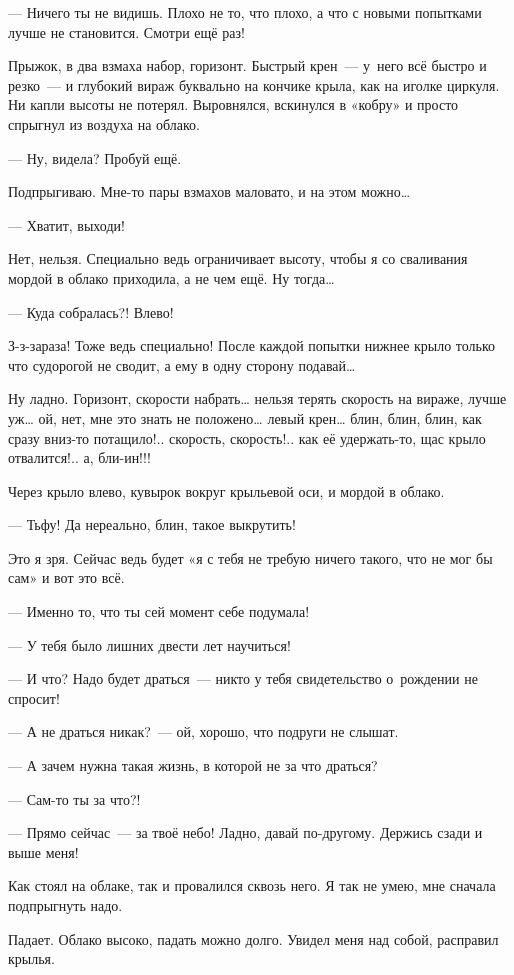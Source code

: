 \documentclass[fontsize=11pt,a5paper,titlepage=firstcover]{scrbook}
\begin{document}
--- Ничего ты не видишь. Плохо не то, что плохо, а что с новыми попытками лучше не становится. Смотри ещё раз!

Прыжок, в два взмаха набор, горизонт. Быстрый крен~--- у~него всё быстро и резко~--- и глубокий вираж буквально на кончике крыла, как на иголке циркуля. Ни капли высоты не потерял. Выровнялся, вскинулся в «кобру» и просто спрыгнул из воздуха на облако.

--- Ну, видела? Пробуй ещё.

Подпрыгиваю. Мне-то пары взмахов маловато, и на этом можно{\ldots}

--- Хватит, выходи!

Нет, нельзя. Специально ведь ограничивает высоту, чтобы я со сваливания мордой в облако приходила, а не чем ещё. Ну тогда{\ldots}

--- Куда собралась?! Влево!

З-з-зараза! Тоже ведь специально! После каждой попытки нижнее крыло только что судорогой не сводит, а ему в одну сторону подавай{\ldots}

Ну ладно. Горизонт, скорости набрать{\ldots} нельзя терять скорость на вираже, лучше уж{\ldots} ой, нет, мне это знать не положено{\ldots} левый крен{\ldots} блин, блин, блин, как сразу вниз-то потащило!.. скорость, скорость!.. как её удержать-то, щас крыло отвалится!.. а, бли-ин!!!

Через крыло влево, кувырок вокруг крыльевой оси, и мордой в облако.

--- Тьфу! Да нереально, блин, такое выкрутить!

Это я зря. Сейчас ведь будет «я с тебя не требую ничего такого, что не мог бы сам» и вот это всё.

--- Именно то, что ты сей момент себе подумала!

--- У тебя было лишних двести лет научиться!

--- И что? Надо будет драться~--- никто у тебя свидетельство о~рождении не спросит!

--- А не драться никак?~--- ой, хорошо, что подруги не слышат.

--- А зачем нужна такая жизнь, в которой не за что драться?

--- Сам-то ты за что?!

--- Прямо сейчас~--- за твоё небо! Ладно, давай по-другому. Держись сзади и выше меня!

Как стоял на облаке, так и провалился сквозь него. Я так не умею, мне сначала подпрыгнуть надо.

Падает. Облако высоко, падать можно долго. Увидел меня над собой, расправил крылья.
\end{document}
